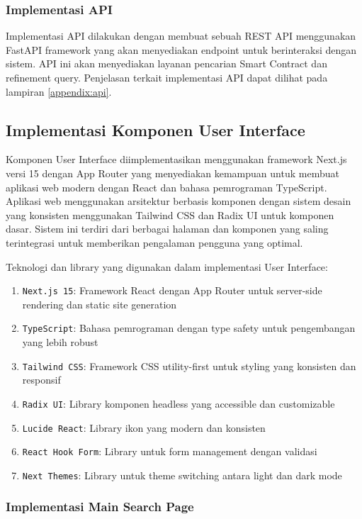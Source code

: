 \subsubsection{Implementasi API}

Implementasi API dilakukan dengan membuat sebuah REST API menggunakan FastAPI framework yang akan menyediakan endpoint untuk berinteraksi dengan sistem. API ini akan menyediakan layanan pencarian Smart Contract dan refinement query. Penjelasan terkait implementasi API dapat dilihat pada lampiran \ref{appendix:api}.

\subsection{Implementasi Komponen User Interface}

Komponen User Interface diimplementasikan menggunakan framework Next.js versi 15 dengan App Router yang menyediakan kemampuan untuk membuat aplikasi web modern dengan React dan bahasa pemrograman TypeScript. Aplikasi web menggunakan arsitektur berbasis komponen dengan sistem desain yang konsisten menggunakan Tailwind CSS dan Radix UI untuk komponen dasar. Sistem ini terdiri dari berbagai halaman dan komponen yang saling terintegrasi untuk memberikan pengalaman pengguna yang optimal.

Teknologi dan library yang digunakan dalam implementasi User Interface:
\begin{enumerate}
	\item \texttt{Next.js 15}: Framework React dengan App Router untuk server-side rendering dan static site generation
	\item \texttt{TypeScript}: Bahasa pemrograman dengan type safety untuk pengembangan yang lebih robust
	\item \texttt{Tailwind CSS}: Framework CSS utility-first untuk styling yang konsisten dan responsif
	\item \texttt{Radix UI}: Library komponen headless yang accessible dan customizable
	\item \texttt{Lucide React}: Library ikon yang modern dan konsisten
	\item \texttt{React Hook Form}: Library untuk form management dengan validasi
	\item \texttt{Next Themes}: Library untuk theme switching antara light dan dark mode
\end{enumerate}

\subsubsection{Implementasi Main Search Page}


